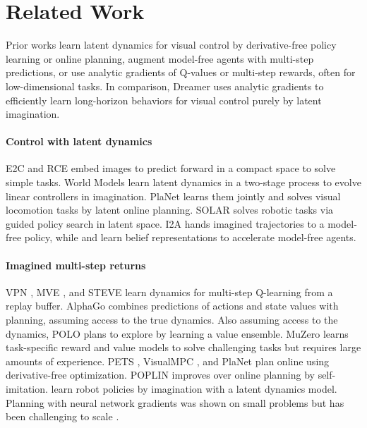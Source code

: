 \section{Related Work}
\label{sec:related}

Prior works learn latent dynamics for visual control by derivative-free policy learning or online planning, augment model-free agents with multi-step predictions, or use analytic gradients of Q-values or multi-step rewards, often for low-dimensional tasks. In comparison, Dreamer uses analytic gradients to efficiently learn long-horizon behaviors for visual control purely by latent imagination.

\paragraph{Control with latent dynamics}

E2C \citep{watter2015e2c} and RCE \citep{banijamali2017rce} embed images to predict forward in a compact space to solve simple tasks. World Models \citep{ha2018worldmodels} learn latent dynamics in a two-stage process to evolve linear controllers in imagination. PlaNet \citep{hafner2018planet} learns them jointly and solves visual locomotion tasks by latent online planning. SOLAR \citep{zhang2018solar} solves robotic tasks via guided policy search in latent space. I2A \citep{weber2017i2a} hands imagined trajectories to a model-free policy, while \citet{lee2019slac} and \citet{gregor2019beliefstate} learn belief representations to accelerate model-free agents.

\paragraph{Imagined multi-step returns}

VPN \citep{oh2017vpn}, MVE \citep{feinberg2018mve}, and STEVE \citep{buckman2018steve} learn dynamics for multi-step Q-learning from a replay buffer. AlphaGo \citep{silver2017alphago} combines predictions of actions and state values with planning, assuming access to the true dynamics. Also assuming access to the dynamics, POLO \citep{lowrey2018polo} plans to explore by learning a value ensemble. MuZero \citep{schrittwieser2019muzero} learns task-specific reward and value models to solve challenging tasks but requires large amounts of experience. PETS \citep{chua2018pets}, VisualMPC \citep{ebert2017visualmpc}, and PlaNet \citep{hafner2018planet} plan online using derivative-free optimization. POPLIN \citep{wang2019poplin} improves over online planning by self-imitation. \citet{piergiovanni2018dreaming} learn robot policies by imagination with a latent dynamics model. Planning with neural network gradients was shown on small problems \citep{schmidhuber1990diffmodel,henaff2018planbybackprop} but has been challenging to scale \citep{parmas2019pipps}.

